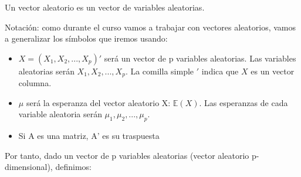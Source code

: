 \documentclass[palatino,nochap]{apuntes}
\begin{document}
Un vector aleatorio es un vector de variables aleatorias.

Notación: como durante el curso vamos a trabajar con vectores aleatorios, vamos a generalizar los símbolos que iremos usando:
\begin{itemize}
\item $X = (X_1, X_2,...,X_p)'$ será un vector de p variables aleatorias. Las variables aleatorias serán $X_1, X_2,...,X_p$. La comilla simple $'$ indica que $X$ es un vector columna.
\item $\mu$ será la esperanza del vector aleatorio X: $\mathbb{E}(X)$. Las esperanzas de cada variable aleatoria serán $\mu_1, \mu_2,...,\mu_p$.
\item Si A es una matriz, A' es su traspuesta
\end{itemize}

Por tanto, dado un vector de p variables aleatorias (vector aleatorio p-dimensional), definimos:
\end{document}

